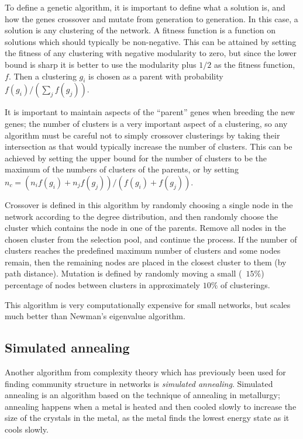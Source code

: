 To define a genetic algorithm, it is important to define what a solution is, and how the genes crossover and mutate from generation to generation. In this case, a solution is any clustering of the network.  A fitness function is a function on solutions which should typically be non-negative. This can be attained by setting the fitness of any clustering with negative modularity to zero, but since the lower bound is sharp it is better to use the modularity plus $1/2$ as the fitness function, $f$. Then a clustering $g_i$ is chosen as a parent with probability $f(g_i)/(\sum_j f(g_j))$.

It is important to maintain aspects of the ``parent'' genes when breeding the new genes; the number of clusters is a very important aspect of a clustering, so any algorithm must be careful not to simply crossover clusterings by taking their intersection as that would typically increase the number of clusters.  This can be achieved by setting the upper bound for the number of clusters to be the maximum of the numbers of clusters of the parents, or by setting $n_c = \left(n_i f(g_i)+n_j f(g_j)\right)/(f(g_i)+f(g_j))$.

Crossover is defined in this algorithm by randomly choosing a single node in the network according to the degree distribution, and then randomly choose the cluster which contains the node in one of the parents.  Remove all nodes in the chosen cluster from the selection pool, and continue the process.  If the number of clusters reaches the predefined maximum number of clusters and some nodes remain, then the remaining nodes are placed in the closest cluster to them (by path distance).  Mutation is defined by randomly moving a small (~$15\%$) percentage of nodes between clusters in approximately $10\%$ of clusterings.

This algorithm is very computationally expensive for small networks, but scales much better than Newman's eigenvalue algorithm.

\subsection{Simulated annealing}

Another algorithm from complexity theory which has previously been used for finding community structure in networks is \emph{simulated annealing}.  Simulated annealing is an algorithm based on the technique of annealing in metallurgy; annealing happens when a metal is heated and then cooled slowly to increase the size of the crystals in the metal, as the metal finds the lowest energy state as it cools slowly.

